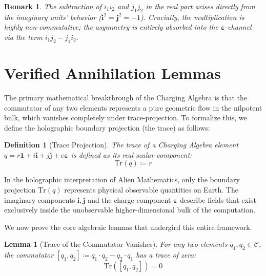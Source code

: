 \documentclass[11pt,a4paper]{book}
\newtheorem{lemma}[theorem]{Lemma}
\newtheorem{definition}[theorem]{Definition}
\newtheorem{remark}[theorem]{Remark}
\begin{document}
\begin{remark}
The subtraction of $i_1 i_2$ and $j_1 j_2$ in the real part arises directly from the imaginary units' behavior ($\mathbf{i}^2 = \mathbf{j}^2 = -1$). 
Crucially, the multiplication is highly non-commutative; the asymmetry is entirely absorbed into the $\boldsymbol{\varepsilon}$-channel via the term $i_1 j_2 - j_1 i_2$.
\end{remark}

\section{Verified Annihilation Lemmas}
\label{sec:annihilation_lemmas}

The primary mathematical breakthrough of the Charging Algebra is that the commutator of any two elements represents a pure geometric flow in the nilpotent bulk, which vanishes completely under trace-projection. 
To formalize this, we define the holographic boundary projection (the trace) as follows:

\begin{definition}[Trace Projection]
The trace of a Charging Algebra element $q = r\mathbf{1} + i\mathbf{i} + j\mathbf{j} + e\boldsymbol{\varepsilon}$ is defined as its real scalar component:
\begin{equation}
\label{eq:trace_def}
\text{Tr}(q) \coloneqq r
\end{equation}
\end{definition}

In the holographic interpretation of Alien Mathematics, only the boundary projection $\text{Tr}(q)$ represents physical observable quantities on Earth. 
The imaginary components $\mathbf{i}, \mathbf{j}$ and the charge component $\boldsymbol{\varepsilon}$ describe fields that exist exclusively inside the unobservable higher-dimensional bulk of the computation.

We now prove the core algebraic lemmas that undergird this entire framework.

\begin{lemma}[Trace of the Commutator Vanishes]
\label{lem:commutator_trace}
For any two elements $q_1, q_2 \in \mathcal{C}$, the commutator $[q_1, q_2] \coloneqq q_1 \cdot q_2 - q_2 \cdot q_1$ has a trace of zero:
\begin{equation}
\text{Tr}([q_1, q_2]) = 0
\end{equation}
\end{lemma}
\end{document}
